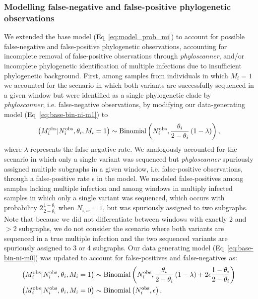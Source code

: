 \documentclass[10pt,letterpaper]{article}
\newcommand{\MI}{M^{\text{\text{obs}}}}
\begin{document}
\subsubsection{Modelling false-negative and false-positive phylogenetic observations}
\label{sec:full_model}
We extended the base model (Eq~\ref{eq:model_prob_mi}) to account for possible false-negative and false-positive phylogenetic observations, accounting for incomplete removal of false-positive observations through \textit{phyloscanner}, and/or incomplete phylogenetic identification of multiple infections due to insufficient phylogenetic background. First, among samples from individuals in which $M_i = 1$ we accounted for the scenario in which both variants are successfully sequenced in a given window but were identified as a single phylogenetic clade by \textit{phyloscanner}, i.e. false-negative observations, by modifying our data-generating model (Eq~\ref{eq:base-bin-ni-m1}) to
\begin{equation}
\left(\MI_i|N^{\text{obs}}_i, \theta_i, M_i = 1\right) \sim \text{Binomial}\left(N^{\text{obs}}_i, \frac{\theta_i}{2-\theta_i}\left(1-\lambda\right)\right),
\end{equation}
where $\lambda$ represents the false-negative rate.
We analogously accounted for the scenario in which only a single variant was sequenced but \textit{phyloscanner} spuriously assigned multiple subgraphs in a given window, i.e. false-positive observations, through a false-positive rate  $\epsilon$ in the model. We modeled false-positives among samples lacking multiple infection and among windows in multiply infected samples in which only a single variant was sequenced, which occurs with probability $2\frac{1-\theta_i}{2-\theta_i}$ when $N_{i,w} = 1$, but was spuriously assigned to two subgraphs. Note that because we did not differentiate between windows with exactly 2 and $>2$ subgraphs, we do not consider the scenario where both variants are sequenced in a true multiple infection and the two sequenced variants are spuriously assigned to 3 or 4 subgraphs. Our data generating model (Eq~\ref{eq:base-bin-ni-m0}) was updated to account for false-positives and false-negatives as:
\begin{subequations}
 \label{eq:full_model_mi_distribution}
 \begin{align}
  \left(\MI_i|N^{\text{obs}}_i, \theta_i, M_i = 1\right) &\sim \text{Binomial}\left(N^{\text{obs}}_i, \frac{\theta_i}{2-\theta_i}\left(1-\lambda\right) + 2\epsilon\frac{1-\theta_i}{2-\theta_i} \right) \\
  \left(\MI_i|N^{\text{obs}}_i, \theta_i, M_i = 0\right) &\sim \text{Binomial}\left(N^{\text{obs}}_i, \epsilon\right),
 \end{align}
\end{subequations}
\end{document}
